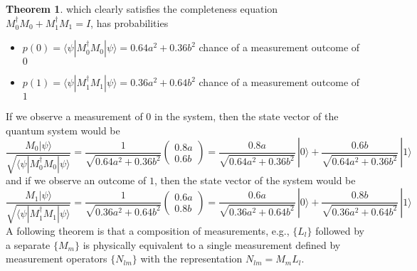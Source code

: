 \documentclass{article}
\theoremstyle{definition}
\newtheorem{theorem}{Theorem}[section]
\begin{document}
\begin{theorem}
which clearly satisfies the completeness equation $M_0^\dagger M_0 + M_1^\dagger M_1 = I$, has probabilities
\begin{itemize}
  \item $p(0) = \langle \psi | M_0^\dagger M_0 | \psi \rangle = 0.64 a^2 + 0.36b^2$ chance of a measurement outcome of $0$
  \item $p(1) = \langle \psi | M_1^\dagger M_1 | \psi \rangle = 0.36 a^2 + 0.64b^2$ chance of a measurement outcome of $1$
\end{itemize}
If we observe a measurement of $0$ in the system, then the state vector of the quantum system would be
\[\frac{M_0 | \psi\rangle}{\sqrt{\langle \psi | M_0^\dagger M_0 | \psi\rangle}} = \frac{1}{\sqrt{0.64a^2 + 0.36b^2}} \begin{pmatrix} 0.8a \\ 0.6b \end{pmatrix} = \frac{0.8a}{\sqrt{0.64a^2 + 0.36b^2}}\, |0 \rangle + \frac{0.6 b}{\sqrt{0.64a^2 + 0.36b^2}} \, |1\rangle\]
and if we observe an outcome of $1$, then the state vector of the system would be
\[\frac{M_1 | \psi\rangle}{\sqrt{\langle \psi | M_1^\dagger M_1 | \psi\rangle}} = \frac{1}{\sqrt{0.36a^2 + 0.64b^2}} \begin{pmatrix} 0.6a \\ 0.8b \end{pmatrix} = \frac{0.6a}{\sqrt{0.36a^2 + 0.64b^2}}\, |0 \rangle + \frac{0.8 b}{\sqrt{0.36a^2 + 0.64b^2}} \, |1\rangle\]
A following theorem is that a composition of measurements, e.g., $\{L_l\}$ followed by a separate $\{M_m\}$ is physically equivalent to a single measurement defined by measurement operators $\{N_{lm}\}$ with the representation $N_{lm} = M_m L_l$.
\end{theorem}
\end{document}

